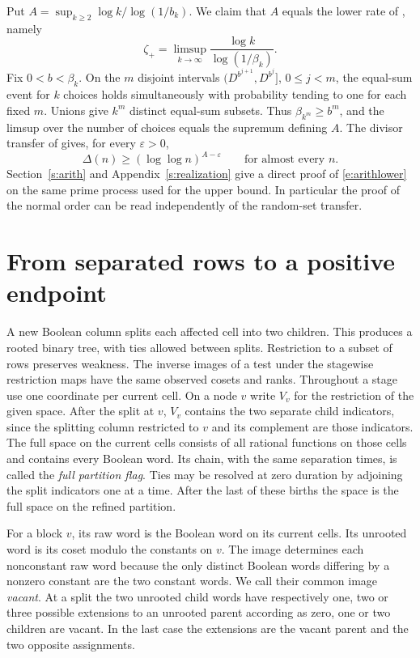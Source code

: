\documentclass[11pt]{article}
\numberwithin{equation}{section}
\begin{document}
Put $A=\sup_{k\ge2}\log k/\log(1/b_k)$. We claim that $A$ equals the lower rate of \cite{fgk}, namely
\[
       \zeta_+=\limsup_{k\to\infty}
                    \frac{\log k}{\log(1/\beta_k)} .
\]
Fix $0<b<\beta_k$.
On the $m$ disjoint intervals $(D^{b^{j+1}},D^{b^j}]$,
$0\le j<m$, the equal-sum event for $k$ choices holds simultaneously
with probability tending to one for each fixed $m$. Unions give
$k^m$ distinct equal-sum subsets. Thus $\beta_{k^m}\ge b^m$, and
the limsup over the number of choices equals the supremum defining
$A$. The divisor transfer of \cite[Theorem~3]{fgk} gives, for every
$\varepsilon>0$,
\begin{equation}
  \Delta(n)\ge(\log\log n)^{A-\varepsilon}
  \qquad\text{for almost every }n .
  \label{e:arithlower}
\end{equation}
Section~\ref{s:arith} and Appendix~\ref{s:realization} give a direct
proof of \eqref{e:arithlower} on the same prime process used for
the upper bound. In particular the proof of the normal order can
be read independently of the random-set transfer.

\section{From separated rows to a positive endpoint}\label{s:open}

A new Boolean column splits each
affected cell into two children. This produces a rooted binary
tree, with ties allowed between splits. Restriction to a subset of
rows preserves weakness. The inverse images of a test under the
stagewise restriction maps have the same observed cosets and ranks.
Throughout a stage use one coordinate per current cell. On a node $v$ write $V_v$ for the restriction of the given space.
After the split at $v$, $V_v$ contains the two separate child
indicators, since the splitting column restricted to $v$ and its
complement are those indicators. The full space on the current
cells consists of all rational functions on those cells and contains
every Boolean word. Its chain, with the same
separation times, is called the \emph{full partition flag}. Ties may
be resolved at zero duration by adjoining the split indicators
one at a time. After the last of these births the space is the
full space on the refined partition.

For a block $v$, its raw word is the Boolean word on its current
cells. Its unrooted word is its coset modulo the constants
on $v$. The image determines each nonconstant raw word because the only
distinct Boolean words differing by a nonzero constant are the
two constant words. We call their common image \emph{vacant}.
At a split the two unrooted child words have respectively one,
two or three possible extensions to an unrooted parent according
as zero, one or two children are vacant. In the last case the
extensions are the vacant parent and the two opposite assignments.
\end{document}
